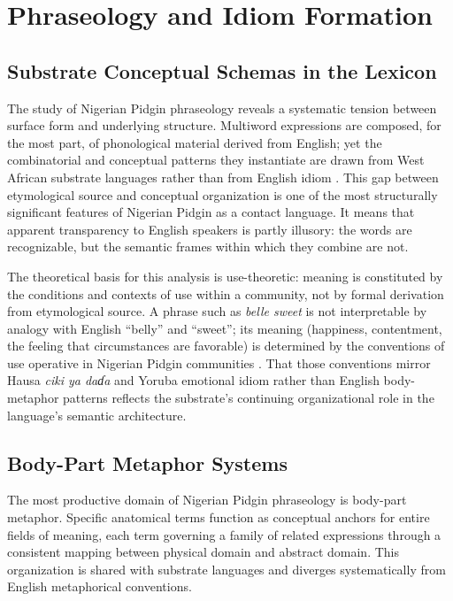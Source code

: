 \documentclass[12pt]{article}
\begin{document}
\section{Phraseology and Idiom Formation}

\subsection{Substrate Conceptual Schemas in the Lexicon}

The study of Nigerian Pidgin phraseology reveals a systematic tension between surface form and underlying structure. Multiword expressions are composed, for the most part, of phonological material derived from English; yet the combinatorial and conceptual patterns they instantiate are drawn from West African substrate languages rather than from English idiom \cite{Frackiewicz2019}. This gap between etymological source and conceptual organization is one of the most structurally significant features of Nigerian Pidgin as a contact language. It means that apparent transparency to English speakers is partly illusory: the words are recognizable, but the semantic frames within which they combine are not.

The theoretical basis for this analysis is use-theoretic: meaning is constituted by the conditions and contexts of use within a community, not by formal derivation from etymological source. A phrase such as \textit{belle sweet} is not interpretable by analogy with English ``belly'' and ``sweet''; its meaning (happiness, contentment, the feeling that circumstances are favorable) is determined by the conventions of use operative in Nigerian Pidgin communities \cite{Frackiewicz2019}. That those conventions mirror Hausa \textit{ciki ya daɗa} and Yoruba emotional idiom rather than English body-metaphor patterns reflects the substrate's continuing organizational role in the language's semantic architecture.

\subsection{Body-Part Metaphor Systems}

The most productive domain of Nigerian Pidgin phraseology is body-part metaphor. Specific anatomical terms function as conceptual anchors for entire fields of meaning, each term governing a family of related expressions through a consistent mapping between physical domain and abstract domain. This organization is shared with substrate languages and diverges systematically from English metaphorical conventions.
\end{document}
